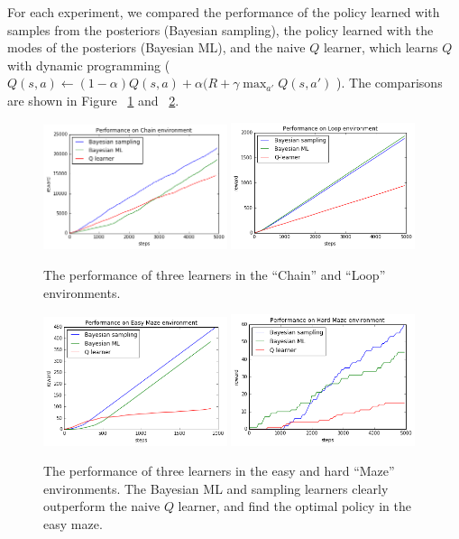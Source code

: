 \documentclass[10pt, twocolumn, twoside]{article}
\begin{document}
For each experiment, we compared the performance of the policy learned with samples from the posteriors
(Bayesian sampling), the policy learned with the modes of the posteriors (Bayesian ML), and the naive $Q$
learner, which learns $Q$ with dynamic programming (
$Q(s, a) \leftarrow (1 - \alpha)Q(s,a) + \alpha(R + \gamma \max_{a'}Q(s, a')$
). The comparisons are shown in Figure ~\ref{fig:chainloopPerf} and
~\ref{fig:easyhardPerf}.

\begin{figure}[!htb]
\centering
\includegraphics[width=0.48\textwidth]{chainPerf.png}
\includegraphics[width=0.48\textwidth]{loopPerf.png}
\caption{\label{fig:chainloopPerf} The performance of three learners in the ``Chain'' and ``Loop''
environments.}
\end{figure}

\begin{figure}[!htb]
\centering
\includegraphics[width=0.48\textwidth]{smallMazePerf.png}
\includegraphics[width=0.48\textwidth]{largeMazePerf.png}
\caption{\label{fig:easyhardPerf} The performance of three learners in the easy and hard ``Maze''
environments. The Bayesian ML and sampling learners clearly outperform the naive $Q$ learner, and
find the optimal policy in the easy maze.}
\end{figure}
\end{document}
